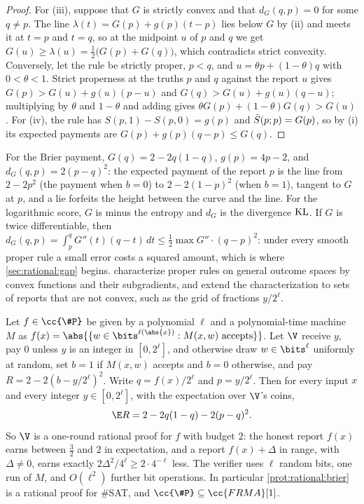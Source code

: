 \begin{refsection}
\begin{proof}
For (iii), suppose that $G$ is strictly convex and that $d_G(q,p)=0$ for some $q\ne p$. The line $\lambda(t)=G(p)+g(p)(t-p)$ lies below $G$ by (ii) and meets it at $t=p$ and $t=q$, so at the midpoint $u$ of $p$ and $q$ we get $G(u)\ge\lambda(u)=\frac12\bigl(G(p)+G(q)\bigr)$, which contradicts strict convexity. Conversely, let the rule be strictly proper, $p<q$, and $u=\theta p+(1-\theta)q$ with $0<\theta<1$. Strict properness at the truths $p$ and $q$ against the report $u$ gives $G(p)>G(u)+g(u)(p-u)$ and $G(q)>G(u)+g(u)(q-u)$; multiplying by $\theta$ and $1-\theta$ and adding gives $\theta G(p)+(1-\theta)G(q)>G(u)$. For (iv), the rule has $S(p,1)-S(p,0)=g(p)$ and $\bar S(p;p)=G(p)$, so by (i) its expected payments are $G(p)+g(p)(q-p)\le G(q)$.
\end{proof}

For the Brier payment, $G(q)=2-2q(1-q)$, $g(p)=4p-2$, and $d_G(q,p)=2(p-q)^2$: the expected payment of the report $p$ is the line from $2-2p^2$ (the payment when $b=0$) to $2-2(1-p)^2$ (when $b=1$), tangent to $G$ at $p$, and a lie forfeits the height between the curve and the line. For the logarithmic score, $G$ is minus the entropy and $d_G$ is the divergence $\mathrm{KL}$. If $G$ is twice differentiable, then $d_G(q,p)=\int_p^qG''(t)(q-t)\,dt\le\frac12\max G''\cdot(q-p)^2$: under every smooth proper rule a small error costs a squared amount, which is where \cref{sec:rational:gap} begins. \Textcite{GneitingRaftery2007} characterize proper rules on general outcome spaces by convex functions and their subgradients, and \textcite{FrongilloKash2021} extend the characterization to sets of reports that are not convex, such as the grid of fractions $y/2^\ell$.

\begin{theorem}\label{thm:rational:sharpp}
Let $f\in\cc{\#P}$ be given by a polynomial $\ell$ and a polynomial-time machine $M$ as $f(x)=\abs{\{w\in\bits^{\ell(\abs{x})}:M(x,w)\text{ accepts}\}}$. Let $\V$ receive $y$, pay $0$ unless $y$ is an integer in $[0,2^\ell]$, and otherwise draw $w\in\bits^\ell$ uniformly at random, set $b=1$ if $M(x,w)$ accepts and $b=0$ otherwise, and pay $R=2-2(b-y/2^\ell)^2$. Write $q=f(x)/2^\ell$ and $p=y/2^\ell$. Then for every input $x$ and every integer $y\in[0,2^\ell]$, with the expectation over $\V$'s coins,
\begin{equation}\label{eq:rational:sharpp}
\E R=2-2q(1-q)-2(p-q)^2 .
\end{equation}
So $\V$ is a one-round rational proof for $f$ with budget $2$: the honest report $f(x)$ earns between $\frac32$ and $2$ in expectation, and a report $f(x)+\Delta$ in range, with $\Delta\ne0$, earns exactly $2\Delta^2/4^{\ell}\ge2\cdot4^{-\ell}$ less. The verifier uses $\ell$ random bits, one run of $M$, and $O(\ell^2)$ further bit operations. In particular \cref{prot:rational:brier} is a rational proof for \#SAT, and $\cc{\#P}\subseteq\cc{FRMA}[1]$.
\end{theorem}


\end{refsection}
